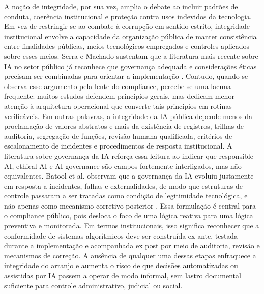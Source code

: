 \documentclass[12pt,a4paper]{article}
\begin{document}
A noção de integridade, por sua vez, amplia o debate ao incluir padrões de conduta, coerência institucional e proteção contra usos indevidos da tecnologia. Em vez de restringir-se ao combate à corrupção em sentido estrito, integridade institucional envolve a capacidade da organização pública de manter consistência entre finalidades públicas, meios tecnológicos empregados e controles aplicados sobre esses meios. Serra e Machado sustentam que a literatura mais recente sobre IA no setor público já reconhece que governança adequada e considerações éticas precisam ser combinadas para orientar a implementação \autocite{serra2024a}. Contudo, quando se observa esse argumento pela lente do compliance, percebe-se uma lacuna frequente: muitos estudos defendem princípios gerais, mas dedicam menor atenção à arquitetura operacional que converte tais princípios em rotinas verificáveis. Em outras palavras, a integridade da IA pública depende menos da proclamação de valores abstratos e mais da existência de registros, trilhas de auditoria, segregação de funções, revisão humana qualificada, critérios de escalonamento de incidentes e procedimentos de resposta institucional.
A literatura sobre governança da IA reforça essa leitura ao indicar que responsible AI, ethical AI e AI governance são campos fortemente interligados, mas não equivalentes. Batool et al. observam que a governança da IA evoluiu justamente em resposta a incidentes, falhas e externalidades, de modo que estruturas de controle passaram a ser tratadas como condição de legitimidade tecnológica, e não apenas como mecanismo corretivo posterior \autocite{batool2025ai}. Essa formulação é central para o compliance público, pois desloca o foco de uma lógica reativa para uma lógica preventiva e monitorada. Em termos institucionais, isso significa reconhecer que a conformidade de sistemas algorítmicos deve ser construída ex ante, testada durante a implementação e acompanhada ex post por meio de auditoria, revisão e mecanismos de correção. A ausência de qualquer uma dessas etapas enfraquece a integridade do arranjo e aumenta o risco de que decisões automatizadas ou assistidas por IA passem a operar de modo informal, sem lastro documental suficiente para controle administrativo, judicial ou social.
\end{document}
